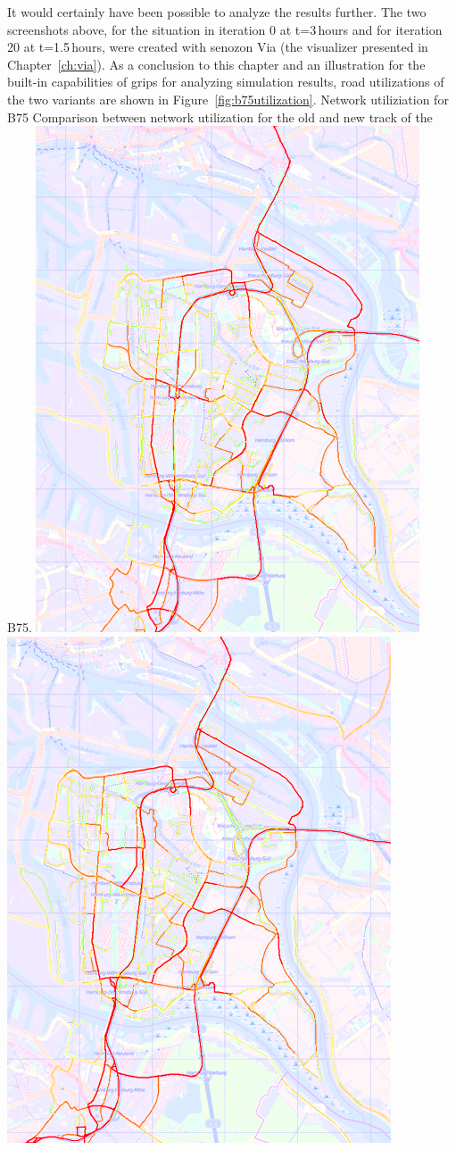 It would certainly have been possible to analyze the results further. The two screenshots above, for the situation in iteration 0 at t=3\,hours and for iteration 20 at t=1.5\,hours, were created with \gls{senozon} Via (the visualizer presented in Chapter~\ref{ch:via}). As a conclusion to this chapter and an illustration for the built-in capabilities of \gls{grips} for analyzing simulation results, road utilizations of the two variants are shown in Figure~\ref{fig:b75utilization}.
%
\createfigure%
{Network utiliziation for B75}%
{Comparison between network utilization for the old and new track of the B75.}%
{\label{fig:b75utilization}}%
{%
  \createsubfigure%
  {}%
  {\includegraphics[width=.475\linewidth]{scenarios/figures/b75utilizationold}}%
  {}%
  {}%
  \createsubfigure%
  {}%
  {\includegraphics[width=.475\linewidth]{scenarios/figures/b75utilizationnew}}
  {}%
  {}%
}%
  {}%
